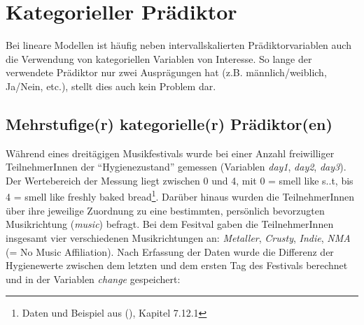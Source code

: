 \documentclass[
]{article}
\begin{document}
\section*{Kategorieller Prädiktor}\label{kategorieller-pruxe4diktor}

Bei lineare Modellen ist häufig neben intervallskalierten Prädiktorvariablen auch die Verwendung von kategoriellen Variablen von Interesse. So lange der verwendete Prädiktor nur zwei Ausprägungen hat (z.B. männlich/weiblich, Ja/Nein, etc.), stellt dies auch kein Problem dar.

\subsection*{Mehrstufige(r) kategorielle(r) Prädiktor(en)}\label{mehrstufiger-kategorieller-pruxe4diktoren}

Während eines dreitägigen Musikfestivals wurde bei einer Anzahl freiwilliger TeilnehmerInnen der ``Hygienezustand'' gemessen (Variablen \emph{day1}, \emph{day2}, \emph{day3}). Der Wertebereich der Messung liegt zwischen 0 und 4, mit 0 = smell like s..t, bis 4 = smell like freshly baked bread\footnote{Daten und Beispiel aus (), Kapitel 7.12.1}. Darüber hinaus wurden die TeilnehmerInnen über ihre jeweilige Zuordnung zu eine bestimmten, persönlich bevorzugten Musikrichtung (\emph{music}) befragt. Bei dem Fesitval gaben die TeilnehmerInnen insgesamt vier verschiedenen Musikrichtungen an: \emph{Metaller}, \emph{Crusty}, \emph{Indie}, \emph{NMA} (= No Music Affiliation). Nach Erfassung der Daten wurde die Differenz der Hygienewerte zwischen dem letzten und dem ersten Tag des Festivals berechnet und in der Variablen \emph{change} gespeichert:
\end{document}
